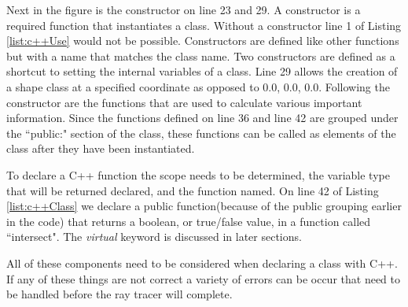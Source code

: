 Next in the figure is the constructor on line 23 and 29.  A constructor is a required function that instantiates a class.  Without a constructor line 1 of Listing \ref{list:c++Use} would not be possible.  Constructors are defined like other functions but with a name that matches the class name.  Two constructors are defined as a shortcut to setting the internal variables of a class.  Line 29 allows the creation of a shape class at a specified coordinate as opposed to 0.0, 0.0, 0.0.  Following the constructor are the functions that are used to calculate various important information.  Since the functions defined on line 36 and line 42 are grouped under the ``public:" section of the class, these functions can be called as elements of the class after they have been instantiated.

To declare a C++ function the scope needs to be determined, the variable type that will be returned declared, and the function named. On line 42 of Listing \ref{list:c++Class} we declare a public function(because of the public grouping earlier in the code) that returns a boolean, or true/false value, in a function called ``intersect". The \textit{virtual} keyword is discussed in later sections.

All of these components need to be considered when declaring a class with C++.  If any of these things are not correct a variety of errors can be occur that need to be handled before the ray tracer will complete.

